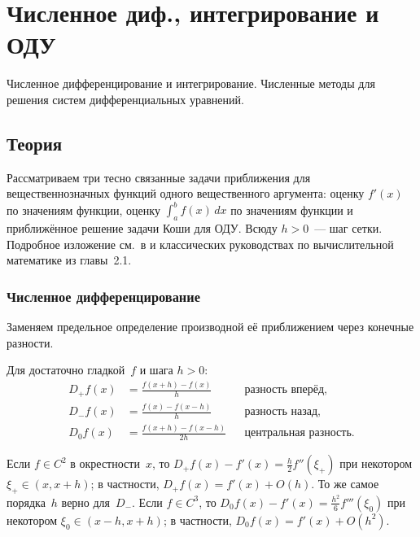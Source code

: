 
\section{Численное диф., интегрирование и ОДУ}
\label{sec:1.3.05-numerical-diff-int-ode}

\begin{ticket}
Численное дифференцирование и интегрирование. Численные методы для решения систем дифференциальных уравнений.
\end{ticket}

\subsection*{Теория}

Рассматриваем три тесно связанные задачи приближения для
вещественнозначных функций одного вещественного аргумента: оценку
$f'(x)$ по значениям функции, оценку $\int_a^b f(x)\, dx$ по значениям
функции и приближённое решение задачи Коши для ОДУ. Всюду $h > 0$~---
шаг сетки. Подробное изложение см.\ в \cite[гл.~28]{CLRS2013} и
классических руководствах по вычислительной математике из главы~2.1.

\subsubsection*{Численное дифференцирование}

Заменяем предельное определение производной её приближением через
конечные разности.

\begin{definition}
\label{def:finite-diff}
Для достаточно гладкой~$f$ и шага $h > 0$:
\begin{align*}
  D_+ f(x) &= \frac{f(x + h) - f(x)}{h} && \text{разность вперёд,} \\
  D_- f(x) &= \frac{f(x) - f(x - h)}{h} && \text{разность назад,} \\
  D_0 f(x) &= \frac{f(x + h) - f(x - h)}{2h} && \text{центральная разность.}
\end{align*}
\end{definition}

\begin{theorem}
\label{thm:finite-diff-error}
Если $f \in C^2$ в окрестности~$x$, то
$D_+ f(x) - f'(x) = \tfrac{h}{2} f''(\xi_+)$ при некотором
$\xi_+ \in (x, x + h)$; в частности, $D_+ f(x) = f'(x) + O(h)$. То же
самое порядка~$h$ верно для~$D_-$. Если $f \in C^3$, то
$D_0 f(x) - f'(x) = \tfrac{h^2}{6} f'''(\xi_0)$ при некотором
$\xi_0 \in (x - h, x + h)$; в частности, $D_0 f(x) = f'(x) + O(h^2)$.
\end{theorem}

